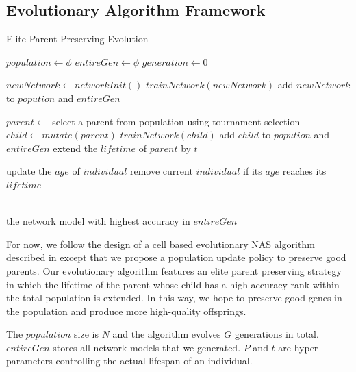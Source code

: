 \documentclass[conference]{IEEEtran}
\begin{document}
  \subsection{Evolutionary Algorithm Framework}
  
  \begin{algorithm}[H]  
    \caption{ Elite Parent Preserving Evolution}
    \begin{algorithmic}[1]  
  
    \State $population\gets \phi$
    \State $entireGen\gets \phi$
    \State $generation\gets 0$
    
    \State $newNetwork\gets networkInit()$
    \State $trainNetwork(newNetwork)$
    \State add $newNetwork$ to $popution$ and $entireGen$
    \EndWhile
    
  
    
      \State $parent\gets$ select a parent from population using tournament selection 
      \State $child \gets mutate(parent)$
      \State $trainNetwork(child)$
      \State add $child$ to $popution$ and $entireGen$
        \State extend the $lifetime$ of $parent$ by $t$
      \EndIf
      
        \State update the $age$ of $individual$
        \State remove current $individual$ if its $ age $ reaches its $lifetime$
      \EndFor
      
      
    \EndWhile
    
    
    \\  
    \Return the network model with highest accuracy in $entireGen$
 
  \end{algorithmic}  
  \end{algorithm}  
  For now, we follow the design of a cell based evolutionary NAS algorithm described in\cite{DBLP:journals/corr/abs-1802-01548} except that we propose a population update policy to preserve good parents. 
  Our evolutionary algorithm features an elite parent preserving strategy in which the lifetime of the parent whose child has a high accuracy rank within the total population is extended. In this way, we hope to preserve good genes in the population and produce more high-quality offsprings.

The $population$ size is $N$ and the algorithm evolves $G$ generations in total. $entireGen$ stores all network models that we generated. $P$ and $t$ are hyper-parameters controlling the actual lifespan of an individual.
     
\end{document}
